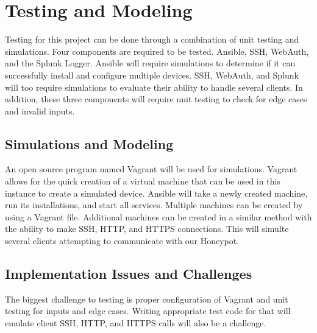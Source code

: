 \chapter{Testing and Modeling}
Testing for this project can be done through a combination of unit testing and simulations. Four components are required to be tested. Ansible, SSH, WebAuth, and the Splunk Logger. Ansible will require simulations to determine if it can successfully install and configure multiple devices. SSH, WebAuth, and Splunk will too require simulations to evaluate their ability to handle several clients. In addition, these three components will require unit testing to check for edge cases and invalid inputs.

\section{Simulations and Modeling}
An open source program named Vagrant will be used for simulations. Vagrant allows for the quick creation of a virtual machine that can be used in this instance to create a simulated device. Ansible will take a newly created machine, run its installations, and start all services. Multiple machines can be created by using a Vagrant file. Additional machines can be created in a similar method with the ability to make SSH, HTTP, and HTTPS connections. This will simulte several clients attempting to communicate with our Honeypot.

\section{Implementation Issues and Challenges}
The biggest challenge to testing is proper configuration of Vagrant and unit testing for inputs and edge cases. Writing appropriate test code for that will emulate client SSH, HTTP, and HTTPS calls will also be a challenge.

